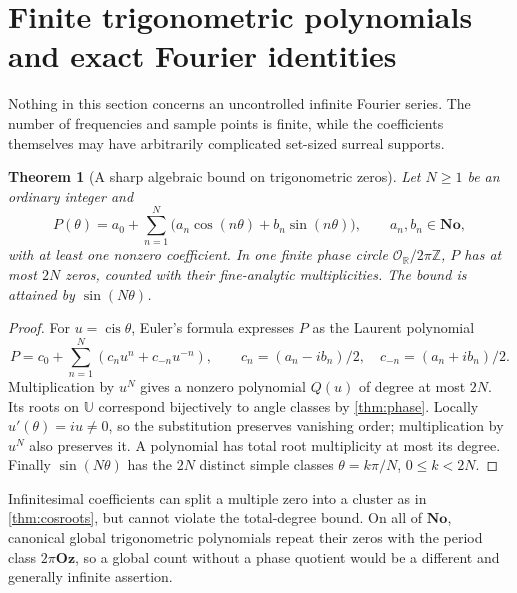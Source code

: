 \documentclass[11pt,letterpaper]{article}
\newtheorem{theorem}{Theorem}[section]
\theoremstyle{definition}
\theoremstyle{remark}
\newcommand{\No}{\mathbf{No}}
\newcommand{\Oz}{\mathbf{Oz}}
\newcommand{\R}{\mathbb R}\newcommand{\C}{\mathbb C}
\newcommand{\Z}{\mathbb Z}\newcommand{\N}{\mathbb N}
\newcommand{\OO}{\mathcal O}\newcommand{\mm}{\mathfrak m}
\newcommand{\UU}{\mathbb U}\newcommand{\HH}{\mathcal H}
\newcommand{\cis}{\operatorname{cis}}
\numberwithin{equation}{section}
\begin{document}
\section{Finite trigonometric polynomials and exact Fourier identities}\label{sec:fourier}
Nothing in this section concerns an uncontrolled infinite Fourier series. The number of frequencies and sample points is finite, while the coefficients themselves may have arbitrarily complicated set-sized surreal supports.

\begin{theorem}[A sharp algebraic bound on trigonometric zeros]\label{thm:trigpoly}
Let $N\ge1$ be an ordinary integer and
\[
 P(\theta)=a_0+\sum_{n=1}^N\bigl(a_n\cos(n\theta)+b_n\sin(n\theta)\bigr),
 \qquad a_n,b_n\in\No,
\]
with at least one nonzero coefficient. In one finite phase circle $\OO_{\R}/2\pi\Z$, $P$ has at most $2N$ zeros, counted with their fine-analytic multiplicities. The bound is attained by $\sin(N\theta)$.
\end{theorem}
\begin{proof}
For $u=\cis\theta$, Euler's formula expresses $P$ as the Laurent polynomial
\[
 P=c_0+\sum_{n=1}^N(c_nu^n+c_{-n}u^{-n}),\qquad
 c_n=(a_n-ib_n)/2,\quad c_{-n}=(a_n+ib_n)/2.
\]
Multiplication by $u^N$ gives a nonzero polynomial $Q(u)$ of degree at most $2N$. Its roots on $\UU$ correspond bijectively to angle classes by \cref{thm:phase}. Locally $u'(\theta)=iu\ne0$, so the substitution preserves vanishing order; multiplication by $u^N$ also preserves it. A polynomial has total root multiplicity at most its degree. Finally $\sin(N\theta)$ has the $2N$ distinct simple classes $\theta=k\pi/N$, $0\le k<2N$.
\end{proof}
Infinitesimal coefficients can split a multiple zero into a cluster as in \cref{thm:cosroots}, but cannot violate the total-degree bound. On all of $\No$, canonical global trigonometric polynomials repeat their zeros with the period class $2\pi\Oz$, so a global count without a phase quotient would be a different and generally infinite assertion.
\end{document}
